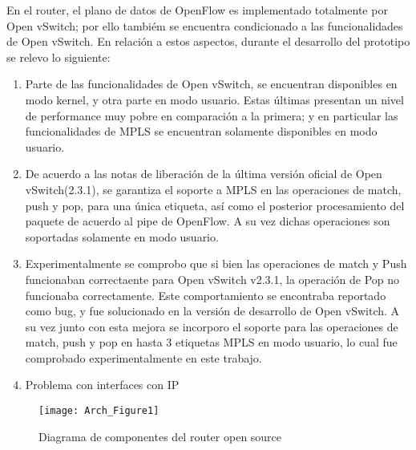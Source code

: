 En el router, el plano de datos de OpenFlow es implementado totalmente por Open vSwitch; por ello tambi\'em se encuentra condicionado a las funcionalidades de Open vSwitch. En relaci\'on a estos aspectos, durante el desarrollo del prototipo se relevo lo siguiente:

\begin{enumerate}
\item Parte de las funcionalidades de Open vSwitch, se encuentran disponibles en modo kernel, y otra parte en modo usuario. Estas \'ultimas presentan un nivel de performance muy pobre en comparaci\'on a la primera; y en particular las funcionalidades de MPLS se encuentran solamente disponibles en modo usuario.

\item De acuerdo a las notas de liberaci\'on de la \'ultima versi\'on oficial de Open vSwitch(2.3.1), 
se garantiza el soporte a MPLS en las operaciones de match, push y pop, para una \'unica etiqueta, as\'i como el posterior procesamiento del paquete de acuerdo al pipe de OpenFlow. A su vez dichas operaciones son soportadas solamente en modo usuario.

\item Experimentalmente se comprobo que si bien las operaciones de match y Push funcionaban correctaente para Open vSwitch v2.3.1, la operaci\'on de Pop no funcionaba correctamente. Este comportamiento se encontraba reportado como bug, y fue solucionado en la versi\'on de desarrollo de Open vSwitch. A su vez junto con esta mejora se incorporo el soporte para las operaciones de match, push y pop en hasta 3 etiquetas MPLS en modo usuario, lo cual fue comprobado experimentalmente en este trabajo.

\item Problema con interfaces con IP

\end{enumerate}


\newpage
\begin{figure}[htbp!] 
\centering    
\texttt{[image: Arch\_Figure1]}
\caption[OpenSourceRArch]{Diagrama de componentes del router open source}
\label{fig:OpenSourceRArch}
\end{figure}


